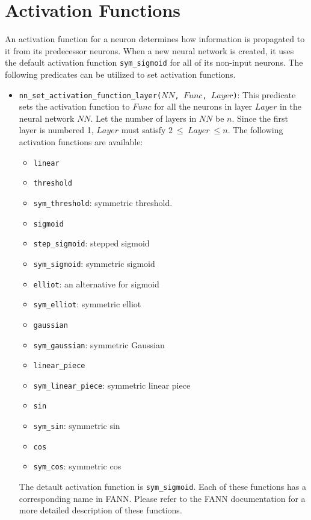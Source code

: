 \section{Activation Functions}
An activation function for a neuron determines how information is propagated to it from its predecessor neurons. When a new neural network is created, it uses the default activation function \texttt{sym\_sigmoid} for all of its non-input neurons. The following predicates can be utilized to set activation functions.

\begin{itemize}
\item \texttt{nn\_set\_activation\_function\_layer($NN$, $Func$, $Layer$)}: This predicate sets the activation function to $Func$ for all the neurons in layer $Layer$ in the neural network $NN$. Let the number of layers in $NN$ be $n$. Since the first layer is numbered 1, $Layer$ must satisfy $2\ \le\ Layer\ \le n$. The following activation functions are available:
\begin{itemize}
\item \texttt{linear}
\item \texttt{threshold}
\item \texttt{sym\_threshold}: symmetric threshold.
\item \texttt{sigmoid}
\item \texttt{step\_sigmoid}: stepped sigmoid
\item \texttt{sym\_sigmoid}: symmetric sigmoid
\item \texttt{elliot}: an alternative for sigmoid
\item \texttt{sym\_elliot}: symmetric elliot
\item \texttt{gaussian}
\item \texttt{sym\_gaussian}: symmetric Gaussian
\item \texttt{linear\_piece}
\item \texttt{sym\_linear\_piece}: symmetric linear piece
\item \texttt{sin}
\item \texttt{sym\_sin}: symmetric sin
\item \texttt{cos}
\item \texttt{sym\_cos}: symmetric cos
\end{itemize}
The detault activation function is \texttt{sym\_sigmoid}. Each of these functions has a corresponding name in FANN. Please refer to the FANN documentation for a more detailed description of these functions.


\end{itemize}
